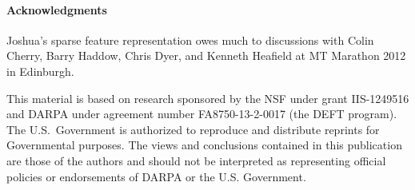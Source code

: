 \documentclass[11pt]{article}
\begin{document}
\paragraph{Acknowledgments}

Joshua's sparse feature representation owes much to discussions with
Colin Cherry, Barry Haddow, Chris Dyer, and Kenneth Heafield at MT
Marathon 2012 in Edinburgh.

This material is based on research sponsored by the NSF under grant
IIS-1249516 and DARPA under agreement number FA8750-13-2-0017 (the
DEFT program).  The U.S.\ Government is authorized to reproduce and
distribute reprints for Governmental purposes.  The views and
conclusions contained in this publication are those of the authors and
should not be interpreted as representing official policies or
endorsements of DARPA or the U.S. Government.



\end{document}
